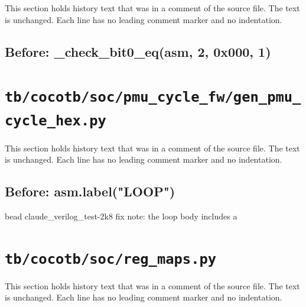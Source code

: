 This section holds history text that was in a comment of the source file. The text is unchanged. Each line has no leading comment marker and no indentation.

\begin{record}

\subsection*{Before: \_check\_bit0\_eq(asm, 2, 0x000, 1)}


\end{record}

\section{\texttt{tb/cocotb/soc/pmu\_cycle\_fw/gen\_pmu\_cycle\_hex.py}}\label{cr:suite:soc-pmu-cycle-fw-gen-pmu-cycle-hex}

This section holds history text that was in a comment of the source file. The text is unchanged. Each line has no leading comment marker and no indentation.

\begin{record}

\subsection*{Before: asm.label("LOOP")}

\begin{textblock}
bead claude_verilog_test-2k8 fix note: the loop body includes a
\end{textblock}

\end{record}

\section{\texttt{tb/cocotb/soc/reg\_maps.py}}\label{cr:suite:soc-reg-maps}

This section holds history text that was in a comment of the source file. The text is unchanged. Each line has no leading comment marker and no indentation.

